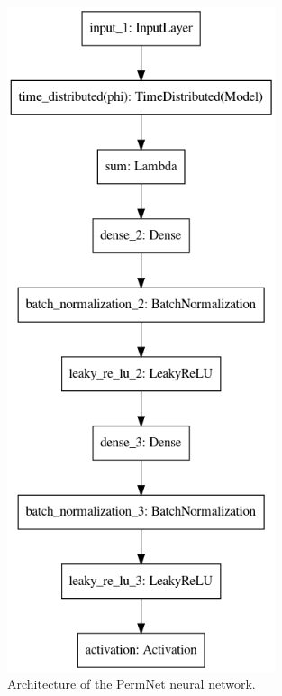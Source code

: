 \begin{figure}
  \centerfloat
  \includegraphics[width=0.7\textwidth]{figures/quarks/TensorFlow_model.png}
  \caption[PermNet Architecture]
          {Architecture of the PermNet neural network. } 
  \label{fig:q:permnet_architecture}
\end{figure}
\clearpage




